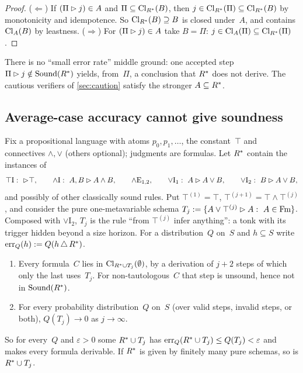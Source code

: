 \begin{proof}
($\Leftarrow$) If $(\Pi\rhd j)\in A$ and $\Pi\subseteq\mathrm{Cl}_{R^{*}}(B)$, then $j\in\mathrm{Cl}_{R^{*}}(\Pi)\subseteq\mathrm{Cl}_{R^{*}}(B)$ by monotonicity and idempotence. So $\mathrm{Cl}_{R^{*}}(B)\supseteq B$ is closed under~$A$, and contains $\mathrm{Cl}_A(B)$ by leastness.
($\Rightarrow$) For $(\Pi\rhd j)\in A$ take $B=\Pi$: $j\in\mathrm{Cl}_A(\Pi)\subseteq\mathrm{Cl}_{R^{*}}(\Pi)$.
\end{proof}

There is no ``small error rate'' middle ground: one accepted step $\Pi\rhd j\notin\mathrm{Sound}(R^{*})$ yields, from~$\Pi$, a conclusion that $R^{*}$ does not derive. The cautious verifiers of \cref{sec:caution} satisfy the stronger $A\subseteq R^{*}$.

\subsection{Average-case accuracy cannot give soundness}\label{sec:search:tonk}

Fix a propositional language with atoms $p_0,p_1,\dots$, the constant~$\top$ and connectives $\wedge,\vee$ (others optional); judgments are formulas. Let $R^{*}$ contain the instances of
\[
\top\mathrm{I}:\ \rhd\top,\qquad
\wedge\mathrm{I}:\ A,B\rhd A\wedge B,\qquad
\wedge\mathrm{E}_{1,2},\qquad
\vee\mathrm{I}_1:\ A\rhd A\vee B,\qquad
\vee\mathrm{I}_2:\ B\rhd A\vee B,
\]
and possibly of other classically sound rules. Put $\top^{(1)}=\top$, $\top^{(j+1)}=\top\wedge\top^{(j)}$, and consider the pure one-metavariable schema
$T_j:=\{A\vee\top^{(j)}\rhd A:\ A\in\mathrm{Fm}\}$.
Composed with $\vee\mathrm{I}_2$, $T_j$ is the rule ``from $\top^{(j)}$ infer anything'': a tonk \citep{prior1960runabout,belnap1962tonk} with its trigger hidden beyond a size horizon. For a distribution~$Q$ on~$S$ and $h\subseteq S$ write $\mathrm{err}_Q(h):=Q(h\,\triangle\,R^{*})$.

\begin{theorem}\label{thm:search:tonk}
\leavevmode
\begin{enumerate}[label=(\roman*)]
\item Every formula~$C$ lies in $\mathrm{Cl}_{R^{*}\cup T_j}(\emptyset)$, by a derivation of $j+2$ steps of which only the last uses~$T_j$. For non-tautologous~$C$ that step is unsound, hence not in $\mathrm{Sound}(R^{*})$.
\item For every probability distribution~$Q$ on~$S$ (over valid steps, invalid steps, or both), $Q(T_j)\to0$ as $j\to\infty$.
\end{enumerate}
So for every~$Q$ and $\varepsilon>0$ some $R^{*}\cup T_j$ has $\mathrm{err}_Q(R^{*}\cup T_j)\le Q(T_j)<\varepsilon$ and makes every formula derivable. If $R^{*}$ is given by finitely many pure schemas, so is $R^{*}\cup T_j$.
\hspace*{\fill}\allowbreak\hspace*{\fill}
\end{theorem}

